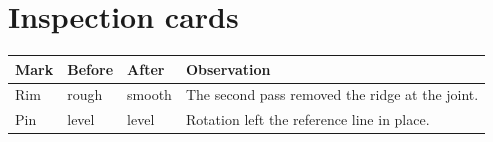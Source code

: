\documentclass{article}
\begin{document}
\section*{Inspection cards}

\begin{tabularx}{\linewidth}{@{}Lm{16mm}b{16mm}X@{}}\toprule
Mark&Before&After&Observation\\\midrule
Rim&rough&smooth&The second pass removed the ridge at the joint.\\
Pin&level&level&Rotation left the reference line in place.\\\bottomrule
\end{tabularx}
\end{document}
